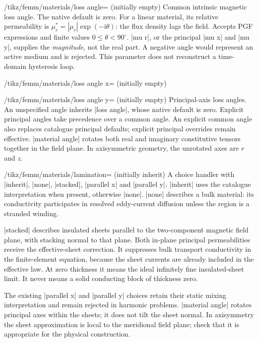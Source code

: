 \begin{key}{/tikz/femm/materials/loss angle= (initially empty)}
Common intrinsic magnetic loss angle. The native default is zero. For a linear
material, its relative permeability is
$\mu_r^*=|\mu_r|\exp(-\mathrm i\theta)$: the flux density lags the field.
Accepts PGF expressions and finite values $0\leq\theta<90^\circ$.
|mu r|, or the principal |mu x| and |mu y|, supplies the \emph{magnitude},
not the real part. A negative angle would represent an active medium and is
rejected. This parameter does not reconstruct a time-domain hysteresis loop.
\end{key}
\begin{key}{/tikz/femm/materials/loss angle x= (initially empty)}
\begin{key}{/tikz/femm/materials/loss angle y= (initially empty)}
Principal-axis loss angles. An unspecified angle inherits |loss angle|, whose
native default is zero. Explicit principal angles take precedence over a common
angle. An explicit common angle also replaces catalogue principal defaults;
explicit principal overrides remain effective. |material angle| rotates both
real and imaginary constitutive tensors together in the field plane.
In axisymmetric geometry, the unrotated axes are $r$ and $z$.
\end{key}
\end{key}
\begin{key}{/tikz/femm/materials/lamination= (initially inherit)}
A choice handler with |inherit|, |none|, |stacked|, |parallel x| and |parallel y|.
|inherit| uses the catalogue interpretation when present, otherwise |none|.
|none| describes a bulk material: its conductivity participates in resolved
eddy-current diffusion unless the region is a stranded winding.

|stacked| describes insulated sheets parallel to the two-component magnetic
field plane, with stacking normal to that plane. Both in-plane principal
permeabilities receive the effective-sheet correction. It suppresses bulk
transport conductivity in the finite-element equation, because the sheet
currents are already included in the effective law. At zero thickness it
means the ideal infinitely fine insulated-sheet limit. It never means a solid
conducting block of thickness zero.

The existing |parallel x| and |parallel y| choices retain their static mixing
interpretation and remain rejected in harmonic problems. |material angle|
rotates principal axes within the sheets; it does not tilt the sheet normal.
In axisymmetry the sheet approximation is local to the meridional field plane;
check that it is appropriate for the physical construction.
\end{key}
